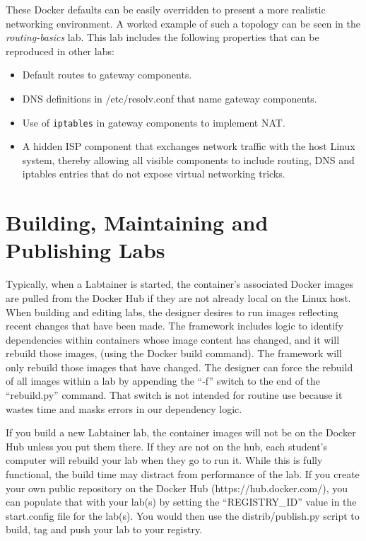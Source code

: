 \documentclass[12pt]{article}
\begin{document}
These Docker defaults can be easily overridden to present a more realistic networking
environment.  A worked example of such a topology can be seen in the \textit{routing-basics} lab.
This lab includes the following properties that can be reproduced in other labs:
\begin{itemize}
\item Default routes to gateway components.
\item DNS definitions in /etc/resolv.conf that name gateway components.
\item Use of \texttt{iptables} in gateway components to implement NAT.
\item A hidden ISP component that exchanges network traffic with the host Linux system,
thereby allowing all visible components to include routing, DNS and iptables entries that do not
expose virtual networking tricks.

\end{itemize}

\section{Building, Maintaining and Publishing Labs} \label{publishing}
Typically, when a Labtainer is started, the container's associated Docker images are pulled from
the Docker Hub if they are not already local on the Linux host.  When building and editing labs,
the designer desires to run images reflecting recent changes that have been made.  The framework
includes logic to identify dependencies within containers whose image content has changed, 
and it will rebuild those images, (using the Docker build command).  The framework will only 
rebuild those images that have changed.  The designer can force the rebuild of all images within
a lab by appending the ``-f'' switch to the end of the ``rebuild.py'' command.  That switch is not
intended for routine use because it wastes time and masks errors in our dependency logic.

If you build a new Labtainer lab, the container images will not be on the Docker Hub unless you put
them there.  If they are not on the hub, each student's computer will rebuild your lab when they go to run it.
While this is fully functional, the build time may distract from performance of the lab.  If you
create your own public repository on the Docker Hub (https://hub.docker.com/), you can populate that
with your lab(s) by setting the ``REGISTRY\_ID'' value in the start.config file for the lab(s). You
would then use the distrib/publish.py script to build, tag and push your lab to your registry.
\end{document}
